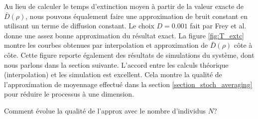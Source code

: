 \documentclass[openany,a4paper,12pt]{article}
\begin{document}
\par Au lieu de calculer le temps d'extinction moyen à partir de la valeur exacte de $\bar D(\rho)$, nous pouvons équalement faire une approximation de bruit constant en utilisant un terme de diffusion constant. Le choix $D=0.001$ fait par Frey et al. \cite{frey2012} donne une assez bonne approximation du résultat exact. La figure \ref{fig:T_extc} montre les courbes obtenues par interpolation et approximation de $\bar D(\rho)$ côte à côte. Cette figure reporte également des résultats de simulations du système, dont nous parlons dans la section suivante. L'accord entre les calculs théorique (interpolation) et les simulation est excellent. Cela montre la qualité de l'approximation de moyennage effectué dans la section \ref{section_stoch_averaging} pour réduire le processus à une dimension.

{\color{red} Comment évolue la qualité de l'approx avec le nombre d'individus $N$?}

\end{document}

